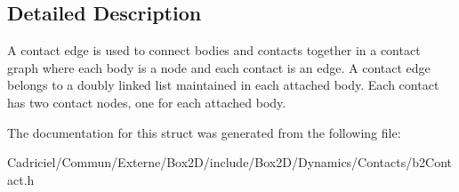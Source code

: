 \subsection{Detailed Description}
A contact edge is used to connect bodies and contacts together in a contact graph where each body is a node and each contact is an edge. A contact edge belongs to a doubly linked list maintained in each attached body. Each contact has two contact nodes, one for each attached body. 

The documentation for this struct was generated from the following file\+:\begin{DoxyCompactItemize}
\item 
Cadriciel/\+Commun/\+Externe/\+Box2\+D/include/\+Box2\+D/\+Dynamics/\+Contacts/b2\+Contact.\+h\end{DoxyCompactItemize}
